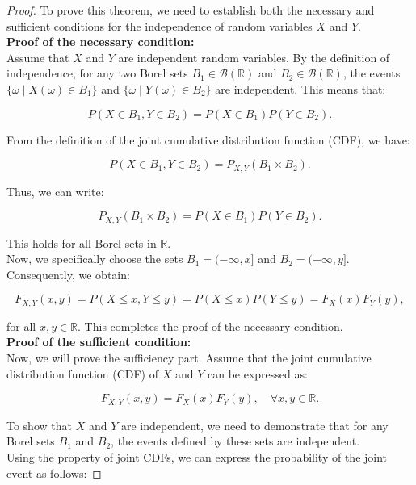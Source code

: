 \begin{proof}
    To prove this theorem, we need to establish both the necessary and sufficient conditions for the independence of random variables \(X\) and \(Y\).\\

    \textbf{Proof of the necessary condition:} \\

Assume that \(X\) and \(Y\) are independent random variables. By the definition of independence, for any two Borel sets \(B_1 \in \mathcal{B}(\mathbb{R})\) and \(B_2 \in \mathcal{B}(\mathbb{R})\), the events \( \{ \omega \mid X(\omega) \in B_1 \} \) and \( \{ \omega \mid Y(\omega) \in B_2 \} \) are independent. This means that:

\[
P(X \in B_1, Y \in B_2) = P(X \in B_1) P(Y \in B_2).
\]

From the definition of the joint cumulative distribution function (CDF), we have:

\[
P(X \in B_1, Y \in B_2) = P_{X,Y}(B_1 \times B_2).
\]

Thus, we can write:

\[
P_{X,Y}(B_1 \times B_2) = P(X \in B_1) P(Y \in B_2).
\]

This holds for all Borel sets in \(\mathbb{R}\). \\

Now, we specifically choose the sets \(B_1 = (-\infty, x]\) and \(B_2 = (-\infty, y]\). Consequently, we obtain:

\[
F_{X,Y}(x, y) = P(X \leq x, Y \leq y) = P(X \leq x) P(Y \leq y) = F_X(x) F_Y(y),
\]

for all \(x, y \in \mathbb{R}\). This completes the proof of the necessary condition.\\

\textbf{Proof of the sufficient condition:}\\

Now, we will prove the sufficiency part. Assume that the joint cumulative distribution function (CDF) of \(X\) and \(Y\) can be expressed as:

\[
F_{X,Y}(x, y) = F_X(x) F_Y(y), \quad \forall x, y \in \mathbb{R}.
\]

To show that \(X\) and \(Y\) are independent, we need to demonstrate that for any Borel sets \(B_1\) and \(B_2\), the events defined by these sets are independent.\\

Using the property of joint CDFs, we can express the probability of the joint event as follows:


\end{proof}
